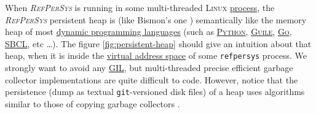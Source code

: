 \documentclass[11pt,a4paper,svgnames]{article}
\newcommand{\RefPerSys}{{\textit{\textsc{RefPerSys}}}}
\begin{document}
When {\RefPerSys} is running in some multi-threaded \textsc{Linux}
\href{https://en.wikipedia.org/wiki/Process\_(computing)}{process},
the {\RefPerSys} persistent heap is (like Bismon's one
\cite{Starynkevitch:2019:bismon-draft}) semantically like the memory
heap of most
\href{https://en.wikipedia.org/wiki/Dynamic\_programming\_language}{dynamic
  programming languages} (such as
\href{https://python.org/}{\textsc{Python}},
\href{https://www.gnu.org/software/guile/}{\textsc{Guile}},
\href{https://golang.org/}{\textsc{Go}},
\href{http://sbcl.org/}{\textsc{SBCL}}, etc \ldots). The
figure \ref{fig:persistent-heap} should give an intuition about that
heap, when it is inside the
\href{https://en.wikipedia.org/wiki/Virtual_address_space}{virtual
  address space} of some \texttt{refpersys} process. We strongly want
to avoid any
\href{https://en.wikipedia.org/wiki/Global\_interpreter\_lock}{GIL},
but multi-threaded precise efficient garbage collector implementations
are quite difficult to code. However, notice that the persistence
(dump as textual \texttt{git}-versioned disk files) of a heap uses
algorithms similar to those of copying garbage collectors
\cite{wilson:1992:uniprocessorgc, jones:2016:gchandbook}.
\end{document}
